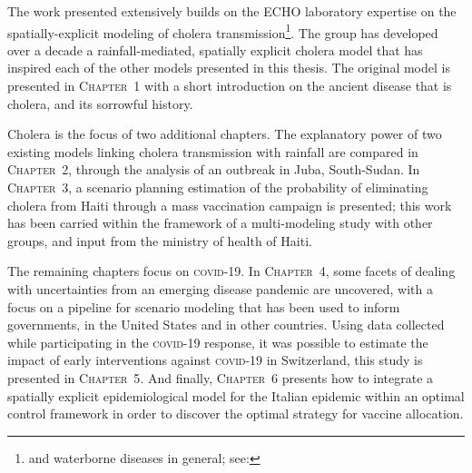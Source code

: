 The work presented extensively builds on the ECHO laboratory expertise on the spatially-explicit modeling of cholera transmission\footnote[][2\baselineskip]{and waterborne diseases in general; see: }. The group has developed over a decade a rainfall-mediated, spatially explicit cholera model that has inspired each of the other models presented in this thesis. The original model is presented in \textsc{Chapter~1} with a short introduction on the ancient disease that is cholera, and its sorrowful history.

Cholera is the focus of two additional chapters. The explanatory power of two existing models linking cholera transmission with rainfall are compared in \textsc{Chapter~2}, through the analysis of an outbreak in Juba, South-Sudan. In \textsc{Chapter~3}, a scenario planning estimation of the probability of eliminating cholera from Haiti through a mass vaccination campaign is presented; this work has been carried within the framework of a multi-modeling study with other groups, and input from the ministry of health of Haiti.

The remaining chapters focus on \textsc{covid}-19. In \textsc{Chapter~4}, some facets of dealing with uncertainties from an emerging disease pandemic are uncovered, with a focus on a pipeline for scenario modeling that has been used to inform governments, in the United States and in other countries. 
Using data collected while participating in the \textsc{covid}-19 response, it was possible to estimate the impact of early interventions against \textsc{covid}-19 in Switzerland, this study is presented in \textsc{Chapter~5}. %
And finally, \textsc{Chapter~6} presents how to integrate a spatially explicit epidemiological model for the Italian epidemic within an optimal control framework in order to discover the optimal strategy for vaccine allocation.



